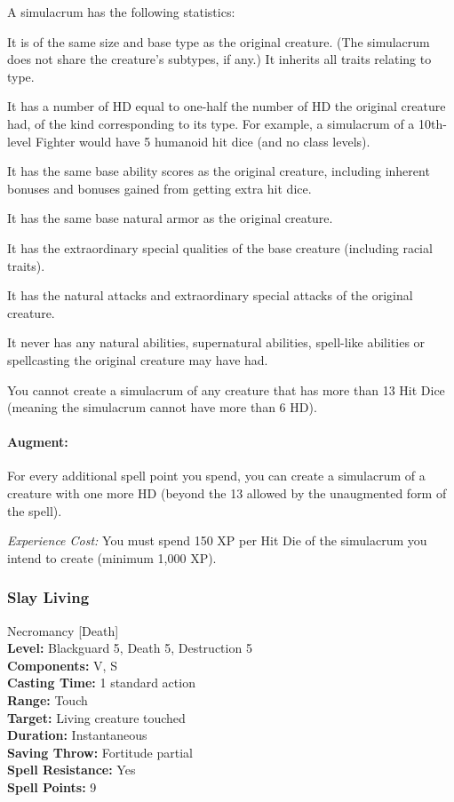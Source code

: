 A simulacrum has the following statistics:
\begin{list}{}{\leftmargin=1em}
 \item It is of the same size and base type as the original creature. 
 (The simulacrum does not share the creature's subtypes, if any.) It inherits all traits relating to type.
 \item It has a number of HD equal to one-half the number of HD the original creature had,
 of the kind corresponding to its type. For example, a simulacrum of a 10th-level Fighter would have 5 humanoid hit dice (and no class levels).
 \item It has the same base ability scores as the original creature, including inherent bonuses and bonuses gained from getting extra hit dice.
 \item It has the same base natural armor as the original creature.
 \item It has the extraordinary special qualities of the base creature (including racial traits).
 \item It has the natural attacks and extraordinary special attacks of the original creature.
 \item It never has any natural abilities, supernatural abilities, spell-like abilities or spellcasting the original creature may have had.
\end{list}

You cannot create a simulacrum of any creature that has more than 13 Hit Dice (meaning the simulacrum cannot have more than 6 HD).

\paragraph{Augment:} For every additional spell point you spend, you can create a simulacrum of a creature with one more HD (beyond the 13 allowed by the unaugmented form of the spell).

\emph{Experience Cost:} You must spend 150 XP per Hit Die of the simulacrum you intend to create (minimum 1,000 XP).
\subsubsection{Slay Living}
\label{Spell:SlayLiving}
Necromancy [Death]
\\ \textbf{Level:} Blackguard 5, Death 5, Destruction 5
\\ \textbf{Components:} V, S
\\ \textbf{Casting Time:} 1 standard action
\\ \textbf{Range:} Touch
\\ \textbf{Target:} Living creature touched
\\ \textbf{Duration:} Instantaneous
\\ \textbf{Saving Throw:} Fortitude partial
\\ \textbf{Spell Resistance:} Yes
\\ \textbf{Spell Points:} 9

